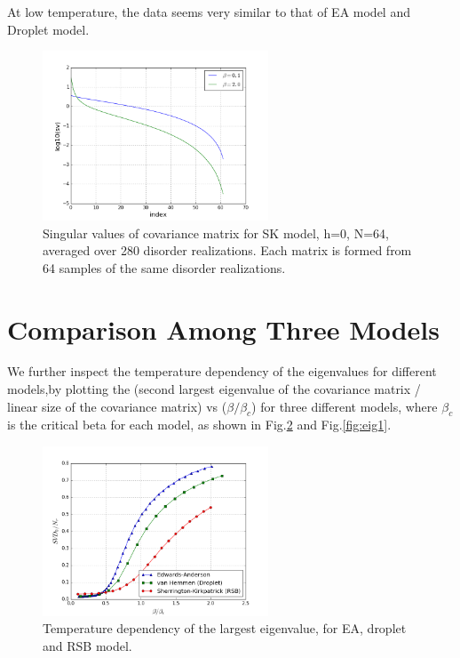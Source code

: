 At low temperature, the data seems very similar to that of EA model and Droplet 
model.


\begin{figure}[ht]
  \centering
  \includegraphics[width=0.6\textwidth]{img/matrix/svdDistRSB.png}
  \caption{Singular values of covariance matrix for SK model, h=0, N=64, 
averaged over 280 disorder realizations. 
Each matrix is formed from 64 samples of the same disorder realizations.}
  \label{fig:eigRSB}
\end{figure}

\section{Comparison Among Three Models}
We further inspect the temperature dependency of the eigenvalues for different
models,by plotting the (second largest eigenvalue of the covariance matrix / linear size 
of the covariance matrix) vs ($\beta/\beta_c$) for three different models, where
$\beta_c$ is the critical beta for each model, as shown in Fig.\ref{fig:eig0} 
and Fig.\ref{fig:eig1}.

\begin{figure}[ht]
  \centering
  \includegraphics[width=0.6\textwidth]{img/matrix/svd0_vs_beta.png}
  \caption{Temperature dependency of the largest eigenvalue, for EA, droplet and RSB model.}
  \label{fig:eig0}
\end{figure}



